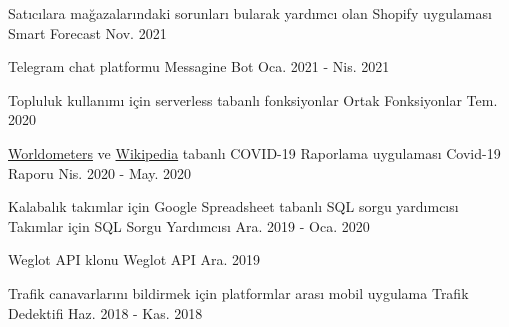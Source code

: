 

\begin{cventries}

  \cventry
    {Satıcılara mağazalarındaki sorunları bularak yardımcı olan Shopify uygulaması} %
    {Smart Forecast} %
    {} %
    {Nov. 2021} %
    {}

  \cventry
    {Telegram chat platformu} %
    {Messagine Bot} %
    {} %
    {Oca. 2021 - Nis. 2021} %
    {}

  \cventry
    {Topluluk kullanımı için serverless tabanlı fonksiyonlar} %
    {Ortak Fonksiyonlar} %
    {} %
    {Tem. 2020} %
    {}

  \cventry
    {\href{https://www.worldometers.info/coronavirus}{Worldometers} ve \href{https://en.wikipedia.org/wiki/COVID-19_pandemic}{Wikipedia} tabanlı COVID-19 Raporlama uygulaması} %
    {Covid-19 Raporu} %
    {} %
    {Nis. 2020 - May. 2020} %
    {}

  \cventry
    {Kalabalık takımlar için Google Spreadsheet tabanlı SQL sorgu yardımcısı} %
    {Takımlar için SQL Sorgu Yardımcısı} %
    {} %
    {Ara. 2019 - Oca. 2020} %
    {}

  \cventry
    {Weglot API klonu} %
    {Weglot API} %
    {} %
    {Ara. 2019} %
    {}

  \cventry
    {Trafik canavarlarını bildirmek için platformlar arası mobil uygulama} %
    {Trafik Dedektifi} %
    {} %
    {Haz. 2018 - Kas. 2018} %
    {}


\end{cventries}
